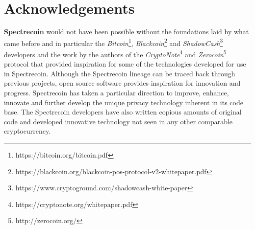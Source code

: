 \section{Acknowledgements}
\textbf{Spectrecoin} would not have been possible without the foundations
laid by what came before and in particular the
\textit{Bitcoin}\footnote{https://bitcoin.org/bitcoin.pdf},
\textit{Blackcoin}\footnote{https://blackcoin.org/blackcoin-pos-protocol-v2-whitepaper.pdf}
and
\textit{ShadowCash}\footnote{https://www.cryptoground.com/shadowcash-white-paper}
developers and the work by the authors of the
\textit{CryptoNote}\footnote{https://cryptonote.org/whitepaper.pdf}
and \textit{Zerocoin}\footnote{http://zerocoin.org/} protocol that
provided inspiration for
some of the technologies developed for use in Spectrecoin. Although the
Spectrecoin lineage can be traced back through previous projects, open
source software provides inspiration for innovation and progress.
Spectrecoin has taken a particular direction to improve, enhance,
innovate and further develop the unique privacy technology inherent
in its code base. The Spectrecoin developers have also written copious
amounts of original code and developed innovative technology not seen
in any other comparable cryptocurrency.
